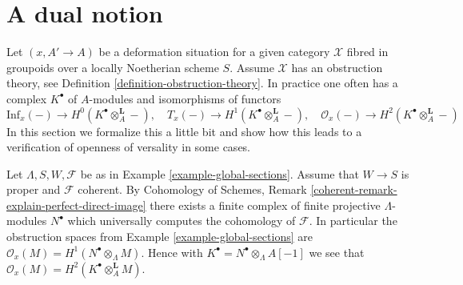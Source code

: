 \section{A dual notion}
\label{section-dual}

\noindent
Let $(x, A' \to A)$ be a deformation situation for a given category
$\mathcal{X}$ fibred in groupoids over a locally Noetherian scheme $S$.
Assume $\mathcal{X}$ has an obstruction theory, see
Definition \ref{definition-obstruction-theory}. In practice
one often has a complex $K^\bullet$ of $A$-modules and isomorphisms of
functors
$$
\text{Inf}_x(-) \to H^0(K^\bullet \otimes_A^\mathbf{L} -),\quad
T_x(-) \to H^1(K^\bullet \otimes_A^\mathbf{L} -),\quad
\mathcal{O}_x(-) \to H^2(K^\bullet \otimes_A^\mathbf{L} -)
$$
In this section we formalize this a little bit and show how this leads
to a verification of openness of versality in some cases.

\begin{example}
\label{example-global-sections-dual}
Let $\Lambda, S, W, \mathcal{F}$ be as in
Example \ref{example-global-sections}.
Assume that $W \to S$ is proper and $\mathcal{F}$ coherent. By
Cohomology of Schemes, Remark
\ref{coherent-remark-explain-perfect-direct-image}
there exists a finite complex of finite projective $\Lambda$-modules
$N^\bullet$ which universally computes the cohomology of $\mathcal{F}$.
In particular the obstruction spaces from Example \ref{example-global-sections}
are $\mathcal{O}_x(M) = H^1(N^\bullet \otimes_\Lambda M)$.
Hence with $K^\bullet = N^\bullet \otimes_\Lambda A[-1]$ we see that
$\mathcal{O}_x(M) = H^2(K^\bullet \otimes_A^\mathbf{L} M)$.
\end{example}

